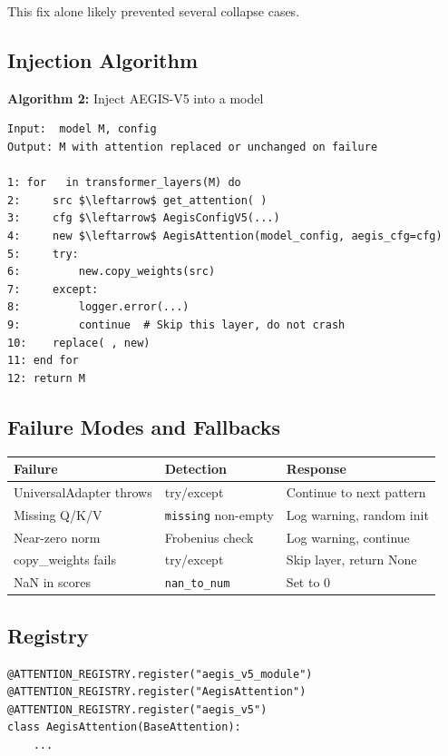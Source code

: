 This fix alone likely prevented several collapse cases.

\subsection{Injection Algorithm}

\textbf{Algorithm 2:} Inject AEGIS-V5 into a model
\begin{lstlisting}
Input:  model M, config
Output: M with attention replaced or unchanged on failure

1: for   in transformer_layers(M) do
2:     src $\leftarrow$ get_attention( )
3:     cfg $\leftarrow$ AegisConfigV5(...)
4:     new $\leftarrow$ AegisAttention(model_config, aegis_cfg=cfg)
5:     try:
6:         new.copy_weights(src)
7:     except:
8:         logger.error(...)
9:         continue  # Skip this layer, do not crash
10:    replace( , new)
11: end for
12: return M
\end{lstlisting}

\subsection{Failure Modes and Fallbacks}

\begin{table}[H]
\centering
\small
\begin{tabular}{lll}
\toprule
\textbf{Failure} & \textbf{Detection} & \textbf{Response} \\
\midrule
UniversalAdapter throws & try/except & Continue to next pattern \\
Missing Q/K/V & \texttt{missing} non-empty & Log warning, random init \\
Near-zero norm & Frobenius check & Log warning, continue \\
copy\_weights fails & try/except & Skip layer, return None \\
NaN in scores & \texttt{nan\_to\_num} & Set to 0 \\
\bottomrule
\end{tabular}
\end{table}

\subsection{Registry}

\begin{lstlisting}
@ATTENTION_REGISTRY.register("aegis_v5_module")
@ATTENTION_REGISTRY.register("AegisAttention")
@ATTENTION_REGISTRY.register("aegis_v5")
class AegisAttention(BaseAttention):
    ...
\end{lstlisting}

